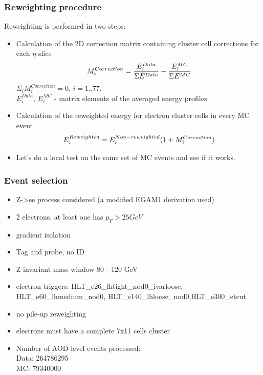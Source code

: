 \documentclass{beamer}
\begin{document}
\begin{frame}
\frametitle{Reweighting procedure}
Reweighting is performed in two steps: 
\begin{itemize}
\item Calculation of the 2D correction matrix containing cluster cell corrections for each $\eta$ slice 
\begin{equation}
\nonumber
   \large {M_{i}^{Correction} = \frac{E_{i}^{Data}}{\Sigma E^{Data}} - \frac{E_{i}^{MC}}{\Sigma E^{MC}}}
\end{equation}
$\Sigma_i M_i^{Correction} = 0$, $i = 1..77$.\\
$E_i^{Data}$, $E_i^{MC}$ - matrix elements of the averaged energy profiles. 
\item Calculation of the reweighted energy for electron cluster cells in every MC event
\begin{equation}
\nonumber
   \large {E_{i}^{Reweighted} = {E_{i}^{Non-reweighted}(1+M_{i}^{Correction})}}
\end{equation}
\item Let's do a local test on the same set of MC events and see if it works.
\end{itemize}
\end{frame}


\begin{frame}
\frametitle{Event selection}

\begin{itemize}
\item Z->ee process considered (a modified EGAM1 derivation used)
\item 2 electrons, at least one has $p_T>25GeV$
\item  gradient isolation
\item  Tag and probe, no ID 
\item  Z invariant mass window 80 - 120 GeV 
\item  electron triggers: HLT\_e26\_lhtight\_nod0\_ivarloose, HLT\_e60\_lhmedium\_nod0, HLT\_e140\_lhloose\_nod0,HLT\_e300\_etcut
\item no pile-up reweighting
\item electrons must have a complete 7x11 cells cluster
\item Number of AOD-level events processed: \\
Data: 264786295 \\
MC: 79340000
\end{itemize}



\end{frame}
\end{document}
